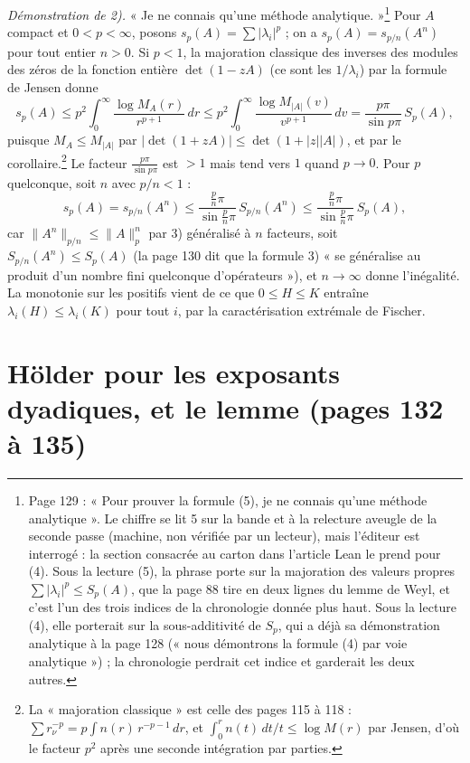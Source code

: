 \documentclass[11pt,a4paper]{article}
\begin{document}
\emph{Démonstration de 2).} « Je ne connais qu'une méthode analytique. »\footnote{Page
129 : « Pour prouver la formule (5), je ne connais qu'une méthode
analytique ». Le chiffre se lit 5 sur la bande et à la relecture aveugle de
la seconde passe (machine, non vérifiée par un lecteur), mais l'éditeur est
interrogé : la section consacrée au carton dans l'article Lean le prend pour
(4). Sous la lecture (5), la phrase porte sur la majoration des valeurs
propres $\sum |\lambda_i|^p \leq S_p(A)$, que la page 88 tire en deux lignes
du lemme de Weyl, et c'est l'un des trois indices de la chronologie donnée
plus haut. Sous la lecture (4), elle porterait sur la sous-additivité de
$S_p$, qui a déjà sa démonstration analytique à la page 128 (« nous
démontrons la formule (4) par voie analytique ») ; la chronologie
perdrait cet indice et garderait les deux autres.}
Pour $A$ compact et $0 < p < \infty$, posons $s_p(A) = \sum |\lambda_i|^p$ ;
on a $s_p(A) = s_{p/n}(A^n)$ pour tout entier $n > 0$. Si $p < 1$, la
majoration classique des inverses des modules des zéros de la fonction
entière $\det(1 - zA)$ (ce sont les $1/\lambda_i$) par la formule de
Jensen donne
\[
  s_p(A) \leq p^2\int_0^\infty \frac{\log M_A(r)}{r^{p+1}}\,dr
  \leq p^2\int_0^\infty \frac{\log M_{|A|}(v)}{v^{p+1}}\,dv
  = \frac{p\pi}{\sin p\pi}\,S_p(A),
\]
puisque $M_A \leq M_{|A|}$ par $|\det(1 + zA)| \leq \det(1 + |z||A|)$, et par
le corollaire.\footnote{La « majoration classique » est celle des pages 115
à 118 : $\sum r_\nu^{-p} = p\int n(r)\,r^{-p-1}\,dr$, et $\int_0^r n(t)\,dt/t
\leq \log M(r)$ par Jensen, d'où le facteur $p^2$ après une seconde
intégration par parties.} Le facteur $\frac{p\pi}{\sin p\pi}$ est $> 1$ mais
tend vers $1$ quand $p \to 0$. Pour $p$ quelconque, soit $n$ avec $p/n < 1$ :
\[
  s_p(A) = s_{p/n}(A^n) \leq \frac{\frac{p}{n}\pi}{\sin\frac{p}{n}\pi}\,
  S_{p/n}(A^n) \leq \frac{\frac{p}{n}\pi}{\sin\frac{p}{n}\pi}\,S_p(A),
\]
car $\|A^n\|_{p/n} \leq \|A\|_p^n$ par 3) généralisé à $n$ facteurs, soit
$S_{p/n}(A^n) \leq S_p(A)$ (la page 130 dit que la formule 3) « se
généralise au produit d'un nombre fini quelconque d'opérateurs »), et $n
\to \infty$ donne l'inégalité. La
monotonie sur les positifs vient de ce que $0 \leq H \leq K$ entraîne
$\lambda_i(H) \leq \lambda_i(K)$ pour tout $i$, par la caractérisation
extrémale de Fischer.

\section*{Hölder pour les exposants dyadiques, et le lemme (pages 132 à 135)}
\end{document}
